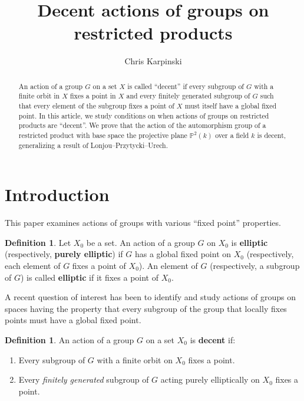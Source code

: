 \documentclass[12pt]{article}
\title{Decent actions of groups on restricted products}
\author{Chris Karpinski}
\theoremstyle{definition}
\newtheorem{defn}[thm]{Definition}
\begin{document}
\maketitle

\begin{abstract}
    An action of a group $G$ on a set $X$ is called ``decent'' if every subgroup of $G$ with a finite orbit in $X$ fixes a point in $X$ and every finitely generated subgroup of $G$ such that every element of the subgroup fixes a point of $X$ must itself have a global fixed point. In this article, we study conditions on when actions of groups on restricted products are ``decent''. We prove that the action of the automorphism group of a restricted product with base space the projective plane $\mathbb{P}^2(k)$ over a field $k$ is decent, generalizing a result of Lonjou--Przytycki--Urech. 
\end{abstract}

\section{Introduction}

This paper examines actions of groups with various ``fixed point'' properties. 

\begin{defn}
    Let $X_0$ be a set. An action of a group $G$ on $X_0$ is \textbf{elliptic} (respectively, \textbf{purely elliptic}) if $G$ has a global fixed point on $X_0$ (respectively, each element of $G$ fixes a point of $X_0$). An element of $G$ (respectively, a subgroup of $G$) is called \textbf{elliptic} if it fixes a point of $X_0$.
\end{defn}

A recent question of interest has been to identify and study actions of groups on spaces having the property that every subgroup of the group that locally fixes points must have a global fixed point. 

\begin{defn}
    \label{def: decent action}
    An action of a group $G$ on a set $X_0$ is \textbf{decent} if: 
    \begin{enumerate}
        \item Every subgroup of $G$ with a finite orbit on $X_0$ fixes a point. 
        \item Every \emph{finitely generated} subgroup of $G$ acting purely elliptically on $X_0$ fixes a point. 
    \end{enumerate}
\end{defn}
\end{document}
